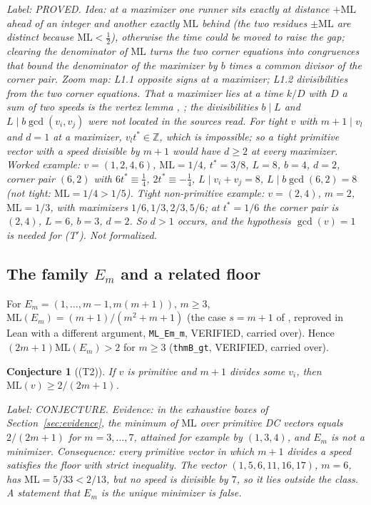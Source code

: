 \documentclass[11pt]{article}
\newtheorem{conjecture}[theorem]{Conjecture}
\theoremstyle{remark}
\newcommand{\ML}{\mathrm{ML}}
\newcommand{\Z}{\mathbb{Z}}
\newcommand{\lab}[1]{\par\smallskip\noindent\textit{Label: #1.}}
\begin{document}
\lab{PROVED. Idea: at a maximizer one runner sits exactly at distance $+\ML$ ahead of an integer and another exactly $\ML$ behind (the two residues $\pm\ML$ are distinct because $\ML<\frac12$), otherwise the time could be moved to raise the gap; clearing the denominator of $\ML$ turns the two corner equations into congruences that bound the denominator of the maximizer by $b$ times a common divisor of the corner pair. Zoom map: L1.1 opposite signs at a maximizer; L1.2 divisibilities from the two corner equations. That a maximizer lies at a time $k/D$ with $D$ a sum of two speeds is the vertex lemma \cite[Lemma~2.2]{Cordella26}, \cite[Section~2]{PS25}; the divisibilities $b\mid L$ and $L\mid b\gcd(v_i,v_j)$ were not located in the sources read. For tight $v$ with $m+1\mid v_l$ and $d=1$ at a maximizer, $v_lt^*\in\Z$, which is impossible; so a tight primitive vector with a speed divisible by $m+1$ would have $d\ge2$ at every maximizer. Worked example: $v=(1,2,4,6)$, $\ML=1/4$, $t^*=3/8$, $L=8$, $b=4$, $d=2$, corner pair $(6,2)$ with $6t^*\equiv\frac14$, $2t^*\equiv-\frac14$, $L\mid v_i+v_j=8$, $L\mid b\gcd(6,2)=8$ (not tight: $\ML=1/4>1/5$). Tight non-primitive example: $v=(2,4)$, $m=2$, $\ML=1/3$, with maximizers $1/6,1/3,2/3,5/6$; at $t^*=1/6$ the corner pair is $(2,4)$, $L=6$, $b=3$, $d=2$. So $d>1$ occurs, and the hypothesis $\gcd(v)=1$ is needed for (T$'$). Not formalized}

\subsection{The family $E_m$ and a related floor}
For $E_m=(1,\dots,m-1,m(m+1))$, $m\ge3$, $\ML(E_m)=(m+1)/(m^2+m+1)$ (the case $s=m+1$ of \cite[Thm.~5.1]{Kravitz21}, reproved in Lean with a different argument, \texttt{ML\_Em\_m}, VERIFIED, carried over). Hence $(2m+1)\ML(E_m)>2$ for $m\ge3$ (\texttt{thmB\_gt}, VERIFIED, carried over).

\begin{conjecture}[(T2)]\label{conj:T2}
If $v$ is primitive and $m+1$ divides some $v_i$, then $\ML(v)\ge 2/(2m+1)$.
\end{conjecture}
\lab{CONJECTURE. Evidence: in the exhaustive boxes of Section~\ref{sec:evidence}, the minimum of $\ML$ over primitive DC vectors equals $2/(2m+1)$ for $m=3,\dots,7$, attained for example by $(1,3,4)$, and $E_m$ is not a minimizer. Consequence: every primitive vector in which $m+1$ divides a speed satisfies the floor with strict inequality. The vector $(1,5,6,11,16,17)$, $m=6$, has $\ML=5/33<2/13$, but no speed is divisible by $7$, so it lies outside the class. A statement that $E_m$ is the unique minimizer is false}
\end{document}
